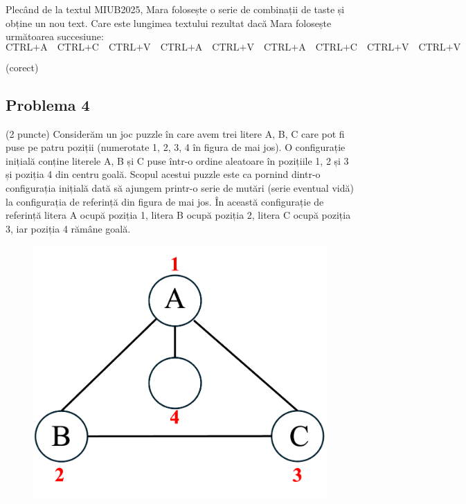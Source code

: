 \documentclass{exam}
\begin{document}
Plecând de la textul MIUB2025, Mara folosește o serie de combinații de taste și obține un nou text. Care este lungimea textului rezultat dacă Mara folosește următoarea succesiune: 
$$
\text{CTRL+A} \quad \text{CTRL+C} \quad \text{CTRL+V} \quad \text{CTRL+A} \quad \text{CTRL+V} \quad \text{CTRL+A} \quad \text{CTRL+C} \quad \text{CTRL+V} \quad \text{CTRL+V}
$$
\begin{oneparchoices}
  (corect)
\end{oneparchoices}

\subsection*{Problema 4}

(2 puncte) Considerăm un joc puzzle în care avem trei litere A, B, C care pot fi puse pe patru poziții (numerotate 1, 2, 3, 4 în figura de mai jos). O configurație inițială conține literele A, B și C puse într-o ordine aleatoare în pozițiile 1, 2 și 3 și poziția 4 din centru goală. Scopul acestui puzzle este ca pornind dintr-o configurația inițială dată să ajungem printr-o serie de mutări (serie eventual vidă) la configurația de referință din figura de mai jos. În această configurație de referință litera A ocupă poziția 1, litera B ocupă poziția 2, litera C ocupă poziția 3, iar poziția 4 rămâne goală.

\begin{figure}[h]
\includegraphics[scale=0.45]{triunghi_ABC_1.png}
\centering
\end{figure}
\end{document}
